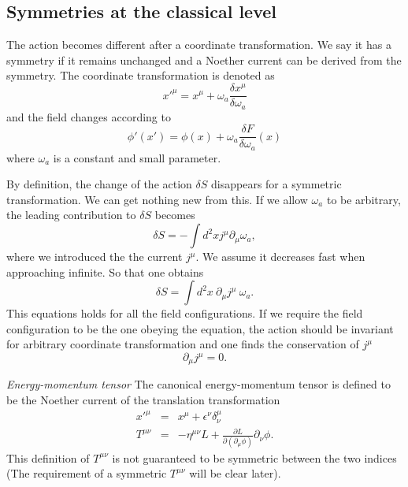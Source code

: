 \documentclass[submission, PhysLectNotes]{SciPost}
\begin{document}
\subsection{Symmetries at the classical level}
The action becomes different after a coordinate transformation. We say it has a symmetry if it remains unchanged and a Noether current can be derived from the symmetry. The coordinate transformation is denoted as
\begin{equation}
    x'^\mu = x^\mu + \omega_a \frac{\delta x^\mu}{\delta \omega_a}
\end{equation}
and the field changes according to
\begin{equation}
    \phi'(x') = \phi(x) + \omega_a \frac{\delta F}{\delta \omega_a}(x)
\end{equation}
where $\omega_a$ is a constant and small parameter.

By definition, the change of the action $\delta S$ disappears for a symmetric transformation. We can get nothing new from this. If we allow $\omega_a$ to be arbitrary, the leading contribution to $\delta S$ becomes
\begin{equation}
    \delta S = -\int d^2x j^\mu \partial_\mu \omega_a,
\end{equation}
where we introduced the the current $j^\mu$. We assume it decreases fast when approaching infinite. So that one obtains
\begin{equation}
    \delta S = \int d^2x\ \partial_\mu j^\mu \ \omega_a.
\end{equation}
This equations holds for all the field configurations. If we require the field configuration to be the one obeying the equation, the action should be invariant for arbitrary coordinate transformation and one finds the conservation of $j^\mu$
\begin{equation}
    \partial_\mu j^\mu = 0.
\end{equation}

{\it Energy-momentum tensor}
The canonical energy-momentum tensor is defined to be the Noether current of the translation transformation
\begin{eqnarray}
    x'^\mu &=& x^\mu + \epsilon^\nu \delta^\mu_\nu \\
    T^{\mu\nu} &=& -\eta^{\mu\nu} L + \frac{\partial L}{\partial(\partial_\mu \phi)}\partial_\nu \phi.
\end{eqnarray}
This definition of $T^{\mu\nu}$ is not guaranteed to be symmetric between the two indices (The requirement of a symmetric $T^{\mu\nu}$ will be clear later).
\end{document}
